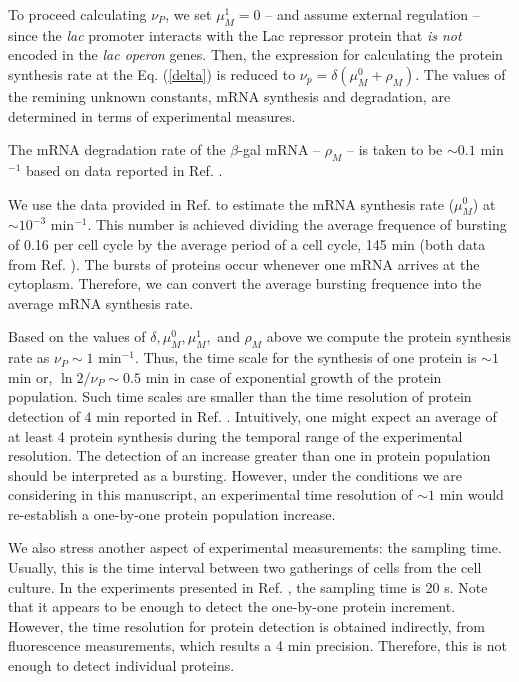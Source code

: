 To proceed calculating $\nu_P$, we set $\mu^1_M = 0$ -- and assume
external regulation -- since the {\em lac} promoter interacts with the
Lac repressor protein that {\em is not} encoded in the {\it lac
  operon} genes. Then, the expression for calculating the protein
synthesis rate at the Eq. (\ref{delta}) is reduced to $\nu_p = \delta
(\mu^0_M+\rho_M).$ The values of the remining unknown constants, mRNA
synthesis and degradation, are determined in terms of experimental
measures.

The mRNA degradation rate of the $\beta$-gal mRNA -- $\rho_M$ -- is
taken to be $\sim 0.1$ min$^{-1}$ based on data reported in
Ref. \cite{dickson81}.

We use the data provided in Ref. \cite{cai06} to estimate the mRNA
synthesis rate ($\mu^0_M$) at $ \sim 10^{-3}$ min$^{-1}$.  This number
is achieved dividing the average frequence of bursting of 0.16 per
cell cycle by the average period of a cell cycle, 145 min (both data
from Ref. \cite{cai06}). The bursts of proteins occur whenever one
mRNA arrives at the cytoplasm. Therefore, we can convert the average
bursting frequence into the average mRNA synthesis rate.

Based on the values of $\delta, \mu_M^0, \mu_M^1,$ and $\rho_M$ above
we compute the protein synthesis rate as $\nu_P \sim 1$ min$^{-1}$.
Thus, the time scale for the synthesis of one protein is $\sim 1$ min
or, $\ln{2}/\nu_P \sim 0.5$ min in case of exponential growth of the
protein population. Such time scales are smaller than the time
resolution of protein detection of 4 min reported in
Ref. \cite{cai06}. Intuitively, one might expect an average of at
least 4 protein synthesis during the temporal range of the
experimental resolution. The detection of an increase greater than one
in protein population should be interpreted as a bursting. However,
under the conditions we are considering in this manuscript, an
experimental time resolution of $\sim 1$ min would re-establish a
one-by-one protein population increase.

We also stress another aspect of experimental measurements: the
sampling time.  Usually, this is the time interval between two
gatherings of cells from the cell culture. In the experiments
presented in Ref. \cite{cai06}, the sampling time is 20 s.  Note that
it appears to be enough to detect the one-by-one protein
increment. However, the time resolution for protein detection is
obtained indirectly, from fluorescence measurements, which results a
4 min precision. Therefore, this is not enough to detect individual
proteins.

